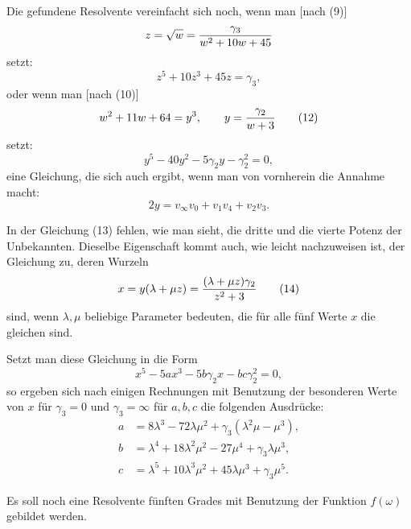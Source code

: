 \documentclass[11pt]{article}
\begin{document}
Die gefundene Resolvente vereinfacht sich noch, wenn man [nach (9)]
\[
 z=\sqrt w={\gamma_3\over w^2+10w+45}
\]
setzt:
\begin{equation}
 z^5+10z^3+45z=\gamma_3,
\tag{11}
\end{equation}
oder wenn man [nach (10)]
\begin{equation}
 w^2+11w+64=y^3,\qquad y={\gamma_2\over w+3}
\tag{12}
\end{equation}
setzt:
\begin{equation}
 y^5-40y^2-5\gamma_2y-\gamma_2^2=0,
\tag{13}
\end{equation}
eine Gleichung, die sich auch ergibt, wenn man von vornherein die Annahme macht:
\[
 2y=v_\infty v_0+v_1v_4+v_2v_3.
\]

In der Gleichung (13) fehlen, wie man sieht, die dritte und die vierte Potenz der Unbekannten. Dieselbe Eigenschaft kommt auch, wie leicht nachzuweisen ist, der Gleichung zu, deren Wurzeln
\begin{equation}
 x=y(\lambda+\mu z)={(\lambda+\mu z)\gamma_2\over z^2+3}
\tag{14}
\end{equation}
sind, wenn \(\lambda,\mu\) beliebige Parameter bedeuten, die für alle fünf Werte \(x\) die gleichen sind.

Setzt man diese Gleichung in die Form
\begin{equation}
 x^5-5ax^3-5b\gamma_2 x-bc\gamma_2^2=0,
\tag{15}
\end{equation}
so ergeben sich nach einigen Rechnungen mit Benutzung der besonderen Werte von \(x\) für \(\gamma_3=0\) und \(\gamma_3=\infty\) für \(a,b,c\) die folgenden Ausdrücke:
\begin{equation}
\begin{aligned}
 a&=8\lambda^3-72\lambda\mu^2+\gamma_3(\lambda^2\mu-\mu^3),\\
 b&=\lambda^4+18\lambda^2\mu^2-27\mu^4+\gamma_3\lambda\mu^3,\\
 c&=\lambda^5+10\lambda^3\mu^2+45\lambda\mu^3+\gamma_3\mu^5.
\end{aligned}
\tag{16}
\end{equation}

Es soll noch eine Resolvente fünften Grades mit Benutzung der Funktion \(f(\omega)\) gebildet werden.
\end{document}
